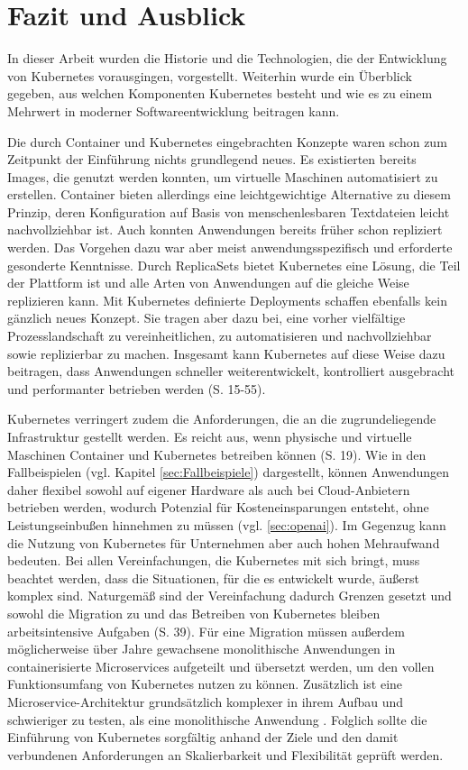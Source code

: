 \documentclass[11pt,a4paper]{article}
\begin{document}
\section{Fazit und Ausblick}
In dieser Arbeit wurden die Historie und die Technologien, die der Entwicklung von Kubernetes
vorausgingen, vorgestellt. Weiterhin wurde ein Überblick gegeben, aus welchen Komponenten
Kubernetes besteht und wie es zu einem Mehrwert in moderner Softwareentwicklung
beitragen kann.

Die durch Container und Kubernetes eingebrachten Konzepte waren schon zum Zeitpunkt der Einführung
nichts grundlegend neues.
Es existierten bereits Images, die genutzt werden konnten, um virtuelle Maschinen automatisiert
zu erstellen. Container bieten allerdings eine leichtgewichtige Alternative zu diesem Prinzip,
deren Konfiguration auf Basis von menschenlesbaren Textdateien leicht nachvollziehbar ist.
Auch konnten Anwendungen bereits früher schon repliziert werden.
Das Vorgehen dazu war aber meist anwendungsspezifisch und erforderte gesonderte Kenntnisse.
Durch \mbox{ReplicaSets} bietet Kubernetes eine Lösung, die Teil der Plattform ist
und alle Arten von Anwendungen auf die gleiche Weise replizieren kann.
Mit Kubernetes definierte Deployments schaffen ebenfalls kein gänzlich neues Konzept.
Sie tragen aber dazu bei, eine vorher vielfältige Prozesslandschaft zu vereinheitlichen,
zu automatisieren und nachvollziehbar sowie replizierbar zu machen.
Insgesamt kann Kubernetes auf diese Weise dazu beitragen, dass
Anwendungen schneller weiterentwickelt, kontrolliert ausgebracht und
performanter betrieben werden \cite{Schmeling_Dargatz_2022} (S. 15-55).

Kubernetes verringert zudem die Anforderungen, die an die zugrundeliegende
Infrastruktur gestellt werden. Es reicht aus, wenn physische und virtuelle Maschinen
Container und Kubernetes betreiben können \cite{cicd_with_kubernetes_devops} (S. 19).
Wie in den Fallbeispielen (vgl. Kapitel \ref{sec:Fallbeispiele}) dargestellt, können Anwendungen daher
flexibel sowohl auf eigener Hardware als auch bei Cloud-Anbietern betrieben werden,
wodurch Potenzial für Kosteneinsparungen entsteht, ohne Leistungseinbußen
hinnehmen zu müssen (vgl. \ref{sec:openai}).
Im Gegenzug kann die Nutzung von Kubernetes für Unternehmen aber auch
hohen Mehraufwand bedeuten.
Bei allen Vereinfachungen, die Kubernetes mit sich bringt, muss beachtet werden,
dass die Situationen, für die es entwickelt wurde, äußerst komplex sind.
Naturgemäß sind der Vereinfachung dadurch Grenzen gesetzt und
sowohl die Migration zu und das Betreiben von Kubernetes bleiben
arbeitsintensive Aufgaben \cite{domingus2022cloud} (S. 39).
Für eine Migration müssen außerdem möglicherweise über Jahre gewachsene monolithische
Anwendungen in containerisierte Microservices aufgeteilt und übersetzt werden,
um den vollen Funktionsumfang von Kubernetes nutzen zu können.
Zusätzlich ist eine Microservice-Architektur grundsätzlich komplexer
in ihrem Aufbau und schwieriger zu testen, als eine monolithische Anwendung \cite{8406008}.
Folglich sollte die Einführung von Kubernetes sorgfältig anhand der Ziele
und den damit verbundenen Anforderungen an Skalierbarkeit und Flexibilität
geprüft werden.
\end{document}
